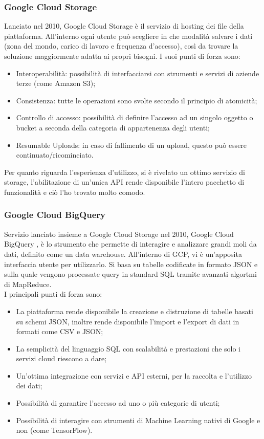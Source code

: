 \subsubsection{Google Cloud Storage}
Lanciato nel 2010, Google Cloud Storage \cite{GoogleCloudStorage} è il servizio di hosting dei file della piattaforma. All'interno ogni utente può scegliere in che modalità salvare i dati (zona del mondo, carico di lavoro e frequenza d'accesso), così da trovare la soluzione maggiormente adatta ai propri bisogni.
I suoi punti di forza sono:
\begin{itemize}
	\item Interoperabilità: possibilità di interfacciarsi con strumenti e servizi di aziende terze (come Amazon S3);
	\item Consistenza: tutte le operazioni sono svolte secondo il principio di \gls{atomicità};
	\item Controllo di accesso: possibilità di definire l'accesso ad un singolo oggetto o \gls{bucket} a seconda della categoria di appartenenza degli utenti;
	\item Resumable Uploads: in caso di fallimento di un upload, questo può essere continuato/ricominciato.
\end{itemize}

Per quanto riguarda l'esperienza d'utilizzo, si è rivelato un ottimo servizio di storage, l'abilitazione di un'unica API rende disponibile l'intero pacchetto di funzionalità e ciò l'ho trovato molto comodo.
\subsubsection{Google Cloud BigQuery}
Servizio lanciato insieme a Google Cloud Storage nel 2010, Google Cloud BigQuery \cite{GoogleCloudBigQuery}, è lo strumento che permette di interagire e analizzare grandi moli da dati, definito come un \gls{data warehouse}. All'interno di GCP, vi è un'apposita interfaccia utente per utilizzarlo. Si basa su tabelle codificate in formato JSON e sulla quale vengono processate query in standard SQL \cite{standardSQL} tramite avanzati algortmi di \gls{MapReduce}.
\\I principali punti di forza sono:
\begin{itemize}
	\item La piattaforma rende disponibile la creazione e distruzione di tabelle basati su schemi JSON, inoltre rende disponibile l'import e l'export di dati in formati come CSV e JSON;
	\item La semplicità del linguaggio SQL con scalabilità e prestazioni che solo i servizi cloud riescono a dare;
	\item Un'ottima integrazione con servizi e API esterni, per la raccolta e l'utilizzo dei dati;
	\item Possibilità di garantire l'accesso ad uno o più categorie di utenti;
	\item Possibilità di interagire con strumenti di Machine Learning nativi di Google e non (come TensorFlow).
\end{itemize}

